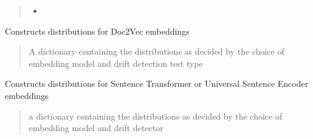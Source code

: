 \documentclass[letterpaper,10pt,english]{sphinxmanual}
\begin{document}
\begin{fulllineitems}
\begin{fulllineitems}
\begin{quote}
\begin{description}
\begin{itemize}
\item {} 
\sphinxAtStartPar
{}

\end{itemize}


\end{description}\end{quote}

\end{fulllineitems}


\begin{fulllineitems}
\label{\detokenize{fldModules/distributions:distributions.distributions.distributions_doc2vec}}
\pysigstartsignatures
{}
\pysigstopsignatures
\sphinxAtStartPar
Constructs distributions for Doc2Vec embeddings
\begin{quote}\begin{description}
\sphinxAtStartPar
A dictionary containing the distributions as decided by the choice of embedding model and drift detection test type

\end{description}\end{quote}

\end{fulllineitems}


\begin{fulllineitems}
\label{\detokenize{fldModules/distributions:distributions.distributions.distributions_seneconders}}
\pysigstartsignatures
{}
\pysigstopsignatures
\sphinxAtStartPar
Constructs distributions for Sentence Transformer or Universal Sentence Encoder embeddings
\begin{quote}\begin{description}
\sphinxAtStartPar
a dictionary containing the distributions as decided by the choice of embedding model and drift detector

\end{description}\end{quote}


\end{fulllineitems}
\end{fulllineitems}
\end{document}
